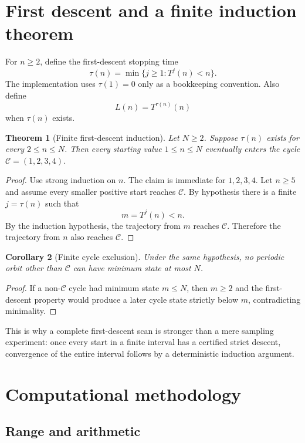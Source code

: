 \documentclass[11pt]{article}
\newtheorem{theorem}{Theorem}[section]
\newtheorem{corollary}[theorem]{Corollary}
\theoremstyle{definition}
\newcommand{\Cyc}{\mathcal{C}}
\begin{document}
\section{First descent and a finite induction theorem}

For $n\ge2$, define the first-descent stopping time
\begin{equation}
\tau(n)=\min\{j\ge1:T^j(n)<n\}.
\label{eq:tau}
\end{equation}
The implementation uses $\tau(1)=0$ only as a bookkeeping convention. Also define
\[
L(n)=T^{\tau(n)}(n)
\]
when $\tau(n)$ exists.

\begin{theorem}[Finite first-descent induction]
Let $N\ge2$. Suppose $\tau(n)$ exists for every $2\le n\le N$. Then every starting value $1\le n\le N$ eventually enters the cycle $\Cyc=(1,2,3,4)$.
\end{theorem}

\begin{proof}
Use strong induction on $n$. The claim is immediate for $1,2,3,4$. Let $n\ge5$ and assume every smaller positive start reaches $\Cyc$. By hypothesis there is a finite $j=\tau(n)$ such that
\[
m=T^j(n)<n.
\]
By the induction hypothesis, the trajectory from $m$ reaches $\Cyc$. Therefore the trajectory from $n$ also reaches $\Cyc$.
\end{proof}

\begin{corollary}[Finite cycle exclusion]
Under the same hypothesis, no periodic orbit other than $\Cyc$ can have minimum state at most $N$.
\end{corollary}

\begin{proof}
If a non-$\Cyc$ cycle had minimum state $m\le N$, then $m\ge2$ and the first-descent property would produce a later cycle state strictly below $m$, contradicting minimality.
\end{proof}

This is why a complete first-descent scan is stronger than a mere sampling experiment: once every start in a finite interval has a certified strict descent, convergence of the entire interval follows by a deterministic induction argument.

\section{Computational methodology}

\subsection{Range and arithmetic}
\end{document}
